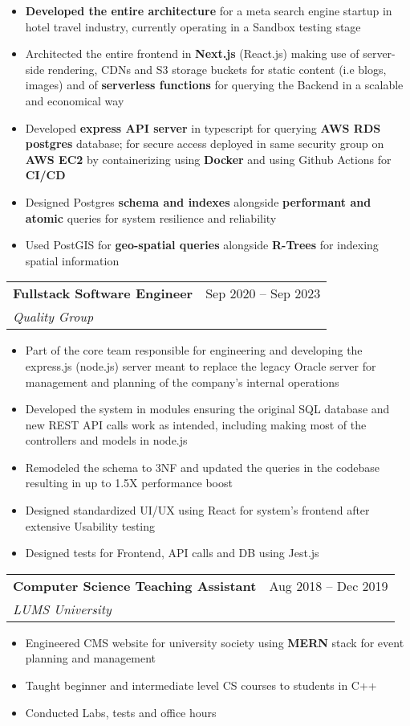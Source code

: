 \documentclass[letterpaper,11pt]{article}
\makeatletter
\newcommand{\resumeItem}[1]{
  \item\small{
    {#1 \vspace{-2pt}}
  }
}
\newcommand{\resumeSubheading}[4]{
  \vspace{-2pt}\item
    \begin{tabular*}{0.97\textwidth}[t]{l@{\extracolsep{\fill}}r}
      \textbf{#1} & #2 \\
      \textit{\small#3} & \textit{\small #4} \\
    \end{tabular*}\vspace{-7pt}
}
\newcommand{\resumeItemListStart}{\begin{itemize}}
\newcommand{\resumeItemListEnd}{\end{itemize}\vspace{-5pt}}
\makeatother
\begin{document}
\resumeItemListStart
\resumeItem{\textbf{Developed the entire architecture} for a meta search engine startup in hotel travel industry, currently operating in a Sandbox testing stage}
\resumeItem{Architected the entire frontend in \textbf{Next.js} (React.js) making use of server-side rendering, CDNs and S3 storage buckets for static content (i.e blogs, images) and of \textbf{serverless functions} for querying the Backend in a scalable and economical way}
\resumeItem{Developed \textbf{express API server} in typescript for querying \textbf{AWS RDS postgres} database; for secure access deployed in same security group on \textbf{AWS EC2} by containerizing using \textbf{Docker} and using Github Actions for \textbf{CI/CD}}
\resumeItem{Designed Postgres \textbf{schema and indexes} alongside \textbf{performant and atomic} queries for system resilience and reliability}
\resumeItem{Used PostGIS for \textbf{geo-spatial queries} alongside \textbf{R-Trees} for indexing spatial information}
\resumeItemListEnd

\resumeSubheading
{Fullstack Software Engineer}{Sep 2020 -- Sep 2023} %
{Quality Group}{}
\resumeItemListStart
\resumeItem{Part of the core team responsible for engineering and developing the express.js (node.js) server meant to replace the legacy Oracle server for management and planning of the company's internal operations}
\resumeItem{Developed the system in modules ensuring the original SQL database and new REST API calls work as intended, including making most of the controllers and models in node.js}
\resumeItem{Remodeled the schema to 3NF and updated the queries in the codebase resulting in up to 1.5X performance boost}
\resumeItem{Designed standardized UI/UX using React for system's frontend after extensive Usability testing}
\resumeItem{Designed tests for Frontend, API calls and DB using Jest.js}
\resumeItemListEnd

\resumeSubheading
{Computer Science Teaching Assistant}{Aug 2018 -- Dec 2019}
{LUMS University}{}
\resumeItemListStart
\resumeItem{Engineered CMS website for university society using \textbf{MERN} stack for event planning and management}
\resumeItem{Taught beginner and intermediate level CS courses to students in C++}
\resumeItem{Conducted Labs, tests and office hours}
\resumeItemListEnd
\end{document}
